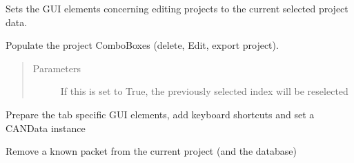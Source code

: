 \documentclass[letterpaper,10pt,english]{sphinxmanual}
\begin{document}
\begin{fulllineitems}
\begin{fulllineitems}
\begin{quote}
\begin{description}
\end{description}\end{quote}

\end{fulllineitems}


\begin{fulllineitems}
\label{\detokenize{src:src.ManagerTab.ManagerTab.populateProjectEditLineEdits}}
Sets the GUI elements concerning editing projects to the current selected project data.

\end{fulllineitems}


\begin{fulllineitems}
\label{\detokenize{src:src.ManagerTab.ManagerTab.populateProjects}}
Populate the project ComboBoxes (delete, Edit, export project).
\begin{quote}\begin{description}
\item[{Parameters}] \leavevmode
{} \textendash{} If this is set to True, the previously selected index will be reselected

\end{description}\end{quote}

\end{fulllineitems}


\begin{fulllineitems}
\label{\detokenize{src:src.ManagerTab.ManagerTab.prepareUI}}
Prepare the tab specific GUI elements, add keyboard shortcuts and set a CANData instance

\end{fulllineitems}


\begin{fulllineitems}
\label{\detokenize{src:src.ManagerTab.ManagerTab.removeKnownPacket}}
Remove a known packet from the current project (and the database)


\end{fulllineitems}
\end{fulllineitems}
\end{document}
